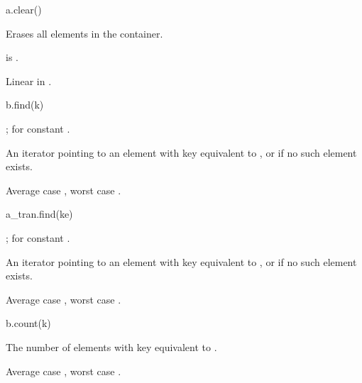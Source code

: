 %
\begin{itemdecl}
a.clear()
\end{itemdecl}

\begin{itemdescr}
\pnum
\result
{}

\pnum
\effects
Erases all elements in the container.

\pnum
\ensures
{} is .

\pnum
\complexity
Linear in .
\end{itemdescr}

%
\begin{itemdecl}
b.find(k)
\end{itemdecl}

\begin{itemdescr}
\pnum
\result
{};  for constant .

\pnum
\returns
An iterator pointing to an element with key equivalent to , or
 if no such element exists.

\pnum
\complexity
Average case , worst case .
\end{itemdescr}

%
\begin{itemdecl}
a_tran.find(ke)
\end{itemdecl}

\begin{itemdescr}
\pnum
\result
{};  for constant .

\pnum
\returns
An iterator pointing to an element with key equivalent to , or
 if no such element exists.

\pnum
\complexity
Average case , worst case .
\end{itemdescr}

%
\begin{itemdecl}
b.count(k)
\end{itemdecl}

\begin{itemdescr}
\pnum
\result
{}

\pnum
\returns
The number of elements with key equivalent to .

\pnum
\complexity
Average case , worst case .
\end{itemdescr}

